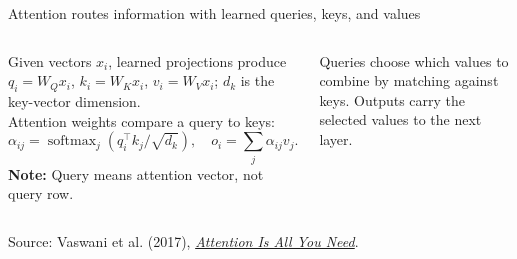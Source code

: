 \documentclass[11pt,aspectratio=169,hyperref={colorlinks}]{beamer}
\newcommand{\slidesource}[1]{\par\vfill\noindent\parbox{\linewidth}{\tiny\color{sourcegray}\raggedright\sloppy Source: #1.}}
\newcommand{\visualdescription}[1]{\par\vspace{.2em}\noindent\parbox{\linewidth}{\centering\tiny\color{sourcegray}#1}}
\begin{document}
\begin{frame}{Attention routes information with learned queries, keys, and values}
\small
\begin{columns}[c]

Given vectors $x_i$, learned projections produce $q_i=W_Qx_i$, $k_i=W_Kx_i$, $v_i=W_Vx_i$; $d_k$ is the key-vector dimension.\\

\medskip
Attention weights compare a query to keys:
\[
\alpha_{ij}=\operatorname{softmax}_j(q_i^\top k_j/\sqrt{d_k}),\quad o_i=\sum_j\alpha_{ij}v_j.
\]
\medskip
{\scriptsize\color{sourcegray}\textbf{Note:} Query means attention vector, not query row.}
\centering
{}
\visualdescription{Queries choose which values to combine by matching against keys. Outputs carry the selected values to the next layer.}
\end{columns}
\slidesource{Vaswani et al. (2017), \href{https://arxiv.org/abs/1706.03762}{\emph{Attention Is All You Need}}}
\end{frame}
\end{document}
